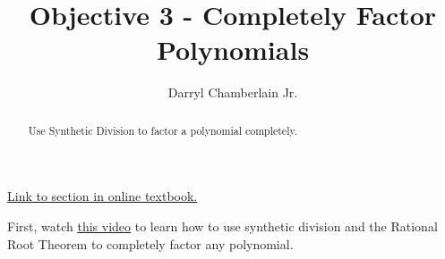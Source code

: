 \documentclass{ximera}
\author{Darryl Chamberlain Jr.}
\title{Objective 3 - Completely Factor Polynomials}
\begin{document}
\begin{abstract}
Use Synthetic Division to factor a polynomial completely.
\end{abstract}
\maketitle
 
\href{https://cnx.org/contents/mwjClAV_@8.1:G7V9LHif@17/Zeros-of-Polynomial-Functions}{Link to section in online textbook.}
 
 
First, watch
\underline{\href{https://mediasite.video.ufl.edu/Mediasite/Play/1a497eb432a54ac38c2f6957859f4ea71d}{this video}} to learn how to use synthetic division and the Rational Root Theorem to completely factor any polynomial.
 
\end{document}
